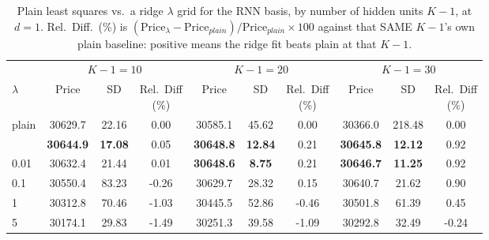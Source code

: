 \begin{table}

\caption{\label{tab:rnn_ridge_lambda_d1}Plain least squares vs.\ a ridge $\lambda$ grid for the RNN basis, by number of hidden units $K-1$, at $d=1$. Rel.\ Diff.\ (\%) is $(\text{Price}_\lambda - \text{Price}_{plain})/\text{Price}_{plain} \times 100$ against that SAME $K-1$'s own plain baseline: positive means the ridge fit beats plain at that $K-1$.}
\footnotesize
\setlength{\tabcolsep}{3pt}
\centering
\begin{tabular}[t]{lccccccccc}
\toprule
\multicolumn{1}{c}{ } & \multicolumn{3}{c}{$K-1 = 10$} & \multicolumn{3}{c}{$K-1 = 20$} & \multicolumn{3}{c}{$K-1 = 30$} \\
\cmidrule(l{3pt}r{3pt}){2-4} \cmidrule(l{3pt}r{3pt}){5-7} \cmidrule(l{3pt}r{3pt}){8-10}
$\lambda$ & Price & SD & \shortstack{Rel.\ Diff\\(\%)} & Price & SD & \shortstack{Rel.\ Diff\\(\%)} & Price & SD & \shortstack{Rel.\ Diff\\(\%)}\\
\midrule
plain & 30629.7 & 22.16 & 0.00 & 30585.1 & 45.62 & 0.00 & 30366.0 & 218.48 & 0.00\\
\addlinespace
0.001 & \textbf{30644.9} & \textbf{17.08} & 0.05 & \textbf{30648.8} & \textbf{12.84} & 0.21 & \textbf{30645.8} & \textbf{12.12} & 0.92\\
0.01 & 30632.4 & 21.44 & 0.01 & \textbf{30648.6} & \textbf{8.75} & 0.21 & \textbf{30646.7} & \textbf{11.25} & 0.92\\
0.1 & 30550.4 & 83.23 & -0.26 & 30629.7 & 28.32 & 0.15 & 30640.7 & 21.62 & 0.90\\
1 & 30312.8 & 70.46 & -1.03 & 30445.5 & 52.86 & -0.46 & 30501.8 & 61.39 & 0.45\\
5 & 30174.1 & 29.83 & -1.49 & 30251.3 & 39.58 & -1.09 & 30292.8 & 32.49 & -0.24\\
\bottomrule
\end{tabular}

\vspace{1em}


\end{table}
